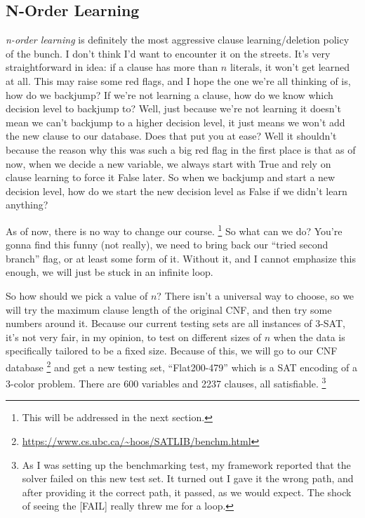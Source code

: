 \documentclass[../main.tex]{subfiles}
\begin{document}
\subsection{N-Order Learning}

\textit{n-order learning} is definitely the most aggressive clause learning/deletion policy of 
the bunch. I don't think I'd want to encounter it on the streets. It's very straightforward in 
idea: if a clause has more than $n$ literals, it won't get learned at all. This may raise some red 
flags, and I hope the one we're all thinking of is, how do we backjump? If we're not learning a clause, 
how do we know which decision level to backjump to? Well, just because we're not learning it doesn't 
mean we can't backjump to a higher decision level, it just means we won't add the new clause to our 
database. Does that put you at ease? Well it shouldn't because the reason why this was such a big 
red flag in the first place is that as of now, when we decide a new variable, we always start with 
True and rely on clause learning to force it False later. So when we backjump and start a new 
decision level, how do we start the new decision level as False if we didn't learn anything?

As of now, there is no way to change our course.
\footnote{This will be addressed in the next section.}
So what can we do? You're gonna find this funny (not really), we need to bring back our 
``tried second branch'' flag, or at least some form of it. Without it, and I cannot emphasize 
this enough, we will just be stuck in an infinite loop.

So how should we pick a value of $n$? There isn't a universal way to choose, so we will try 
the maximum clause length of the original CNF, and then try some numbers around it. Because 
our current testing sets are all instances of 3-SAT, it's not very fair, in my opinion, to 
test on different sizes of $n$ when the data is specifically tailored to be a fixed size. Because 
of this, we will go to our CNF database 
\footnote{\url{https://www.cs.ubc.ca/~hoos/SATLIB/benchm.html}}
and get a new testing set, ``Flat200-479'' which is a SAT encoding of a 3-color problem. There are 
600 variables and 2237 clauses, all satisfiable.
\footnote{As I was setting up the benchmarking test, my framework reported that the solver failed on 
this new test set. It turned out I gave it the wrong path, and after providing it the correct path, it 
passed, as we would expect. The shock of seeing the [FAIL] really threw me for a loop.}
\end{document}
